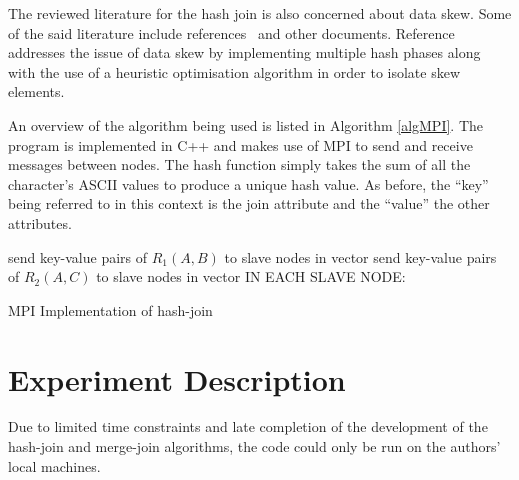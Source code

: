 \documentclass[journal,draftclsnofoot,11pt]{IEEEtran}
\begin{document}
The reviewed literature for the hash join is also concerned about data skew. Some of the said literature include references~\cite{Wolf1990,Keller1991} and other documents. Reference~\cite{Wolf1990} addresses the issue of data skew by implementing multiple hash phases along with the use of a heuristic optimisation algorithm in order to isolate skew elements\cite{Wolf1990}.

An overview of the algorithm being used is listed in Algorithm \ref{algMPI}. The program is implemented in C++ and makes use of MPI to send and receive messages between nodes. The hash function simply takes the sum of all the character's ASCII values to produce a unique hash value. As before, the ``key'' being referred to in this context is the join attribute and the ``value'' the other attributes.
\begin{algorithm}
send key-value pairs of $R_{1}(A,B)$ to slave nodes in vector\;
send key-value pairs of $R_{2}(A,C)$ to slave nodes in vector\;
IN EACH SLAVE NODE:\\
 \caption{MPI Implementation of hash-join}
\label{algMPI}
\end{algorithm}
\section{Experiment Description}\label{desc}
Due to limited time constraints and late completion of the development of the hash-join and merge-join algorithms, the code could only be run on the authors’ local machines.
\end{document}
